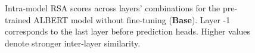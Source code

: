 \documentclass[a4paper, nobind]{templates/ociamthesis}
\begin{document}
\begin{figure}

{\centering {}\newline{}

}

\caption{Intra-model RSA scores across layers' combinations for the pre-trained ALBERT model without fine-tuning (\textbf{Base}). Layer -1 corresponds to the last layer before prediction heads. Higher values denote stronger inter-layer similarity.}\label{fig:rsa-intra-base}
\end{figure}
\end{document}
